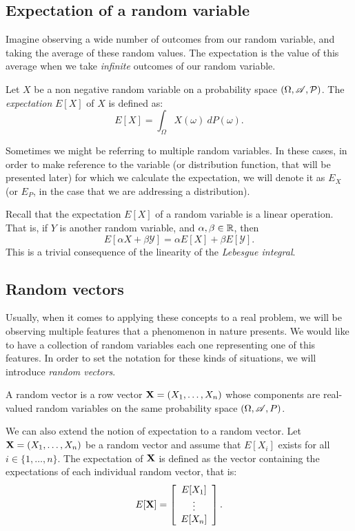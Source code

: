 \subsection*{Expectation of a random variable}

Imagine observing a wide number of outcomes from our random variable, and taking the average of these random values. The expectation is the value of this average when we 
take \emph{infinite} outcomes of our random variable.

\begin{ndef}\label{def:expectation}
Let $X$ be a non negative random variable on a probability space $(\Omega,\mathscr{A},\mathcal{P})$. The \emph{expectation} $E[X]$ of $X$ is defined as:
$$
E[X] = \int_\Omega X(\omega) \ dP(\omega).
$$
\end{ndef}

Sometimes we might be referring to multiple random variables. In these cases, in order to make reference to the variable (or distribution function, that will be presented later) for which we calculate the expectation, we will denote it as $E_X$ (or $E_P$, in the case that we are addressing a distribution).

Recall that the expectation $E[X]$ of a random variable is a linear operation. That is, if $Y$ is another random variable, and $\alpha,\beta \in \mathbb{R}$, then
$$
E[\alpha X + \beta \mathcal Y] = \alpha E[X] + \beta E[\mathcal Y].
$$
This is a trivial consequence of the linearity of the \emph{Lebesgue integral}.


\subsection*{Random vectors}


Usually, when it comes to applying these concepts to a real problem, we will be observing multiple features that a phenomenon in nature presents. We would like to have a collection of random variables each one representing one of this features.
In order to set the notation for these kinds of situations, we will introduce \emph{random vectors}.

\begin{ndef}
  A random vector is a row vector $\mathbf{X} = (X_1,\dots,X_n)$ whose components are real-valued random variables on the same probability space $(\Omega,\mathscr{A},P)$.
\end{ndef}


We can also extend the notion of expectation to a random vector. Let $\mathbf{X} = (X_1,\dots,X_n)$ be a random vector and assume that $E[X_i]$ exists for all $i \in \{1, \dots, n \}$. The expectation of $\mathbf{X}$ is defined as the vector containing the expectations of each individual random vector, that is:
$$
E[\mathbf{X}] = \left[ \begin{array}{c} 
E[X_1]\\
\vdots\\
E[X_n]
\end{array} \right].
$$

